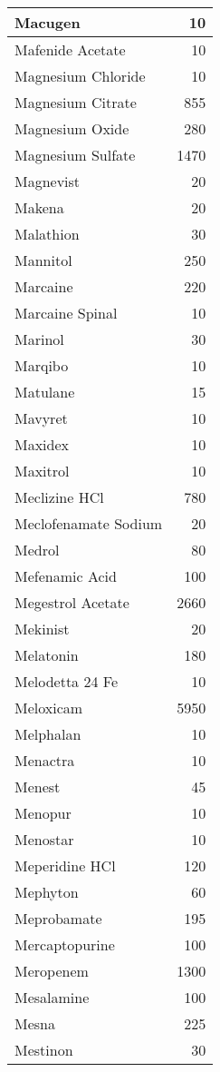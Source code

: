 \documentclass[
]{article}
\begin{document}
\begin{table}
\begin{tabular}[t]{l|r}
\hline
Macugen & 10\\
\hline
Mafenide Acetate & 10\\
\hline
Magnesium Chloride & 10\\
\hline
Magnesium Citrate & 855\\
\hline
Magnesium Oxide & 280\\
\hline
Magnesium Sulfate & 1470\\
\hline
Magnevist & 20\\
\hline
Makena & 20\\
\hline
Malathion & 30\\
\hline
Mannitol & 250\\
\hline
Marcaine & 220\\
\hline
Marcaine Spinal & 10\\
\hline
Marinol & 30\\
\hline
Marqibo & 10\\
\hline
Matulane & 15\\
\hline
Mavyret & 10\\
\hline
Maxidex & 10\\
\hline
Maxitrol & 10\\
\hline
Meclizine HCl & 780\\
\hline
Meclofenamate Sodium & 20\\
\hline
Medrol & 80\\
\hline
Mefenamic Acid & 100\\
\hline
Megestrol Acetate & 2660\\
\hline
Mekinist & 20\\
\hline
Melatonin & 180\\
\hline
Melodetta 24 Fe & 10\\
\hline
Meloxicam & 5950\\
\hline
Melphalan & 10\\
\hline
Menactra & 10\\
\hline
Menest & 45\\
\hline
Menopur & 10\\
\hline
Menostar & 10\\
\hline
Meperidine HCl & 120\\
\hline
Mephyton & 60\\
\hline
Meprobamate & 195\\
\hline
Mercaptopurine & 100\\
\hline
Meropenem & 1300\\
\hline
Mesalamine & 100\\
\hline
Mesna & 225\\
\hline
Mestinon & 30\\

\end{tabular}
\end{table}
\end{document}
